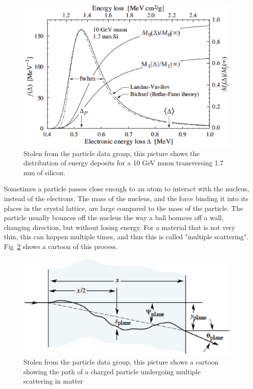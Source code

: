 \begin{figure}[h]
\centering\includegraphics[scale=0.5]{./particleinteractions/Pictures/landau.eps}
\caption{Stolen from the particle data group, this picture shows the distribution of energy deposits for a 10 GeV muon transversing 1.7 mm of silicon. }
\label{fig:landau}
\end{figure}

Sometimes a particle passes close enough to an atom to interact with the nucleus, instead of the electrons.  The mass of the nucleus, and the force binding it into its places in the crystal lattice, are large compared to the mass of the particle.  The particle usually bounces off the nucleus the way a ball bounces off a wall, changing direction, but without losing energy.  For a material that is not very thin, this can happen multiple times, and thus this is called "multiple scattering".  Fig~\ref{fig:pdgmultscattcartoon} shows a cartoon of this process.


\begin{figure}[h]
\centering\includegraphics[scale=0.5]{./particleinteractions/Pictures/multscattcartoon.eps}
\caption{Stolen from the particle data group, this picture shows a cartoon showing the path of a charged particle undergoing multiple scattering in matter }
\label{fig:pdgmultscattcartoon}
\end{figure}



